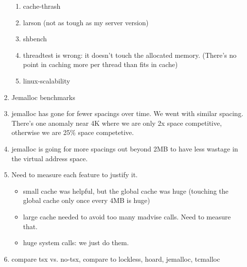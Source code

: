 \begin{enumerate}
\begin{enumerate}
  \item cache-thrash

  \item larson (not as tough as my server version)

  \item shbench

   \item threadtest is wrong: it doesn't touch the allocated memory.  (There's no point in caching more per thread than fits in cache)

  \item linux-scalability

   \end{enumerate}

  \item Jemalloc benchmarks


 \item jemalloc has gone for fewer spacings over time.  We went with
   similar spacing.  There's one anomaly near 4K where we are only 2x
   space competitive, otherwise we are 25\% space competetive.

 \item jemalloc is going for more spacings out beyond 2MB to have less wastage in the virtual address space.

 \item Need to measure each feature to justify it.
  \begin{itemize}
  \item small cache was helpful, but the global cache was huge (touching the global cache only once every 4MB is huge)
  \item large cache needed to avoid too many madvise calls.  Need to measure that.
  \item huge system calls: we just do them.
  \end{itemize}

 \item compare tsx vs. no-tsx, compare to lockless, hoard, jemalloc, tcmalloc


\end{enumerate}
